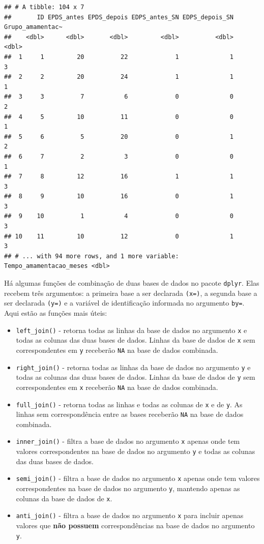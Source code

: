 \documentclass[
]{book}
\begin{document}
\begin{verbatim}
## # A tibble: 104 x 7
##       ID EPDS_antes EPDS_depois EDPS_antes_SN EDPS_depois_SN Grupo_amamentac~
##    <dbl>      <dbl>       <dbl>         <dbl>          <dbl>            <dbl>
##  1     1         20          22             1              1                3
##  2     2         20          24             1              1                1
##  3     3          7           6             0              0                2
##  4     5         10          11             0              0                1
##  5     6          5          20             0              1                2
##  6     7          2           3             0              0                1
##  7     8         12          16             1              1                3
##  8     9         10          16             0              1                3
##  9    10          1           4             0              0                3
## 10    11         10          12             0              1                3
## # ... with 94 more rows, and 1 more variable: Tempo_amamentacao_meses <dbl>
\end{verbatim}

Há algumas funções de combinação de duas bases de dados no pacote \texttt{dplyr}. Elas recebem três argumentos: a primeira base a ser declarada \texttt{(x=)}, a segunda base a ser declarada \texttt{(y=)} e a variável de identificação informada no argumento \texttt{by=}. Aqui estão as funções mais úteis:

\begin{itemize}
\item
  \texttt{left\_join()} - retorna todas as linhas da base de dados no argumento \texttt{x} e todas as colunas das duas bases de dados. Linhas da base de dados de \texttt{x} sem correspondentes em \texttt{y} receberão \texttt{NA} na base de dados combinada.
\item
  \texttt{right\_join()} - retorna todas as linhas da base de dados no argumento \texttt{y} e todas as colunas das duas bases de dados. Linhas da base de dados de \texttt{y} sem correspondentes em \texttt{x} receberão \texttt{NA} na base de dados combinada.
\item
  \texttt{full\_join()} - retorna todas as linhas e todas as colunas de \texttt{x} e de \texttt{y}. As linhas sem correspondência entre as bases receberão \texttt{NA} na base de dados combinada.
\item
  \texttt{inner\_join()} - filtra a base de dados no argumento \texttt{x} apenas onde tem valores correspondentes na base de dados no argumento \texttt{y} e todas as colunas das duas bases de dados.
\item
  \texttt{semi\_join()} - filtra a base de dados no argumento \texttt{x} apenas onde tem valores correspondentes na base de dados no argumento \texttt{y}, mantendo apenas as colunas da base de dados de \texttt{x}.
\item
  \texttt{anti\_join()} - filtra a base de dados no argumento \texttt{x} para incluir apenas valores que \textbf{não possuem} correspondências na base de dados no argumento \texttt{y}.
\end{itemize}
\end{document}
